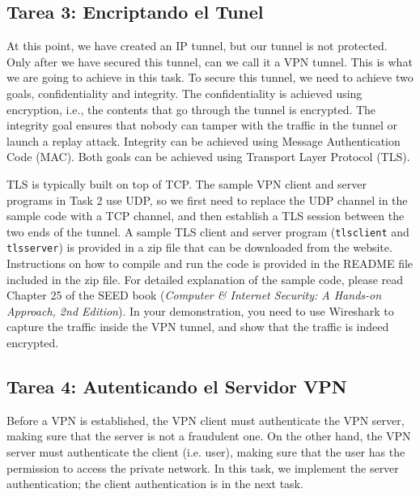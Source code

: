 \subsection{Tarea 3: Encriptando el Tunel}


At this point, we have created an IP tunnel, but our tunnel is not protected. 
Only after we have secured this tunnel, can we call it a VPN tunnel. 
This is what we are going to achieve in this task. 
To secure this tunnel, we need to achieve two 
goals, confidentiality and integrity. 
The confidentiality is achieved using encryption, i.e.,
the contents that go through the tunnel is encrypted. 
The integrity goal ensures that nobody can tamper with 
the traffic in the tunnel or launch a replay attack. 
Integrity can be achieved using 
Message Authentication Code (MAC). 
Both goals can be achieved using Transport Layer Protocol (TLS). 


TLS is typically built on top of TCP. The sample VPN client and server 
programs in Task 2 use UDP, so we first need to 
replace the UDP channel in the sample code with a TCP channel, and then establish a
TLS session between the two ends of the tunnel.  A sample TLS client
and server program (\texttt{tlsclient} and \texttt{tlsserver})   
is provided in a zip file that can be downloaded from the website. 
Instructions on how to compile and run the code
is provided in the README file included in the zip file. 
For detailed explanation of the sample
code, please read Chapter 25 of the SEED book (\textit{Computer \& Internet Security: A
Hands-on Approach, 2nd Edition}). In your demonstration, you need to use Wireshark to
capture the traffic inside the VPN tunnel, and show that the traffic is
indeed encrypted. 



\subsection{Tarea 4: Autenticando el Servidor VPN}


Before a VPN is established, the VPN client must authenticate
the VPN server, making sure that the server is not a fraudulent 
one. On the other hand, the VPN server must authenticate the
client (i.e. user), making sure that the user has 
the permission to access the private network. 
In this task, we implement the server authentication; 
the client authentication is in the next task. 

